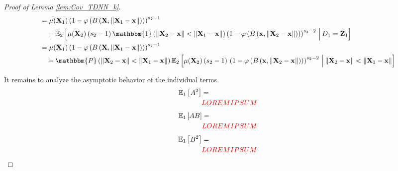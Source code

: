 \documentclass[letterpaper,10pt]{article}
\numberwithin{equation}{section}
\numberwithin{thm}{section}
\numberwithin{lem}{section}
\numberwithin{cor}{section}
\newcommand{\E}{\mathbb{E}}
\newcommand{\1}{\mathbbm{1}}
\renewcommand{\P}{\mathbbm{P}}
\begin{document}
\begin{proof}[Proof of Lemma \ref{lem:Cov_TDNN_k}]
\begin{equation}
\begin{aligned}
			 & = \mu(\mathbf{X}_1) \left(1 - \varphi\left(B\left(\mathbf{X}, \| \mathbf{X}_1 - \mathbf{x} \|\right)\right)\right)^{s_2 - 1} \\
			 & \quad + \E_{2}\left[
				\mu(\mathbf{X}_2)\, (s_2 - 1) \,
				\1\left(\|\mathbf{X}_2 - \mathbf{x}\| < \|\mathbf{X}_1 - \mathbf{x}\|\right)
				\left(1 - \varphi\left(B\left(\mathbf{x}, \| \mathbf{X}_2 - \mathbf{x} \|\right)\right)\right)^{s_2 - 2}
			\, \Big| \, D_1 = \mathbf{Z}_1\right]                                                                                           \\
			 & = \mu(\mathbf{X}_1) \left(1 - \varphi\left(B\left(\mathbf{X}, \| \mathbf{X}_1 - \mathbf{x} \|\right)\right)\right)^{s_2 - 1} \\
			 & \quad + \P\left(\|\mathbf{X}_2 - \mathbf{x}\| < \|\mathbf{X}_1 - \mathbf{x}\|\right)\E_{2}\left[
				\mu(\mathbf{X}_2)\, (s_2 - 1) \,
				\left(1 - \varphi\left(B\left(\mathbf{x}, \| \mathbf{X}_2 - \mathbf{x} \|\right)\right)\right)^{s_2 - 2}
				\, \Big| \, \|\mathbf{X}_2 - \mathbf{x}\| < \|\mathbf{X}_1 - \mathbf{x}\|\right]
		\end{aligned}
	\end{equation}

	It remains to analyze the asymptotic behavior of the individual terms.
	\begin{equation}
		\begin{aligned}
			\E_{1}\left[A^2\right]
			 & =                         \\
			 & {\color{red} LOREM IPSUM}
		\end{aligned}
	\end{equation}
	\begin{equation}
		\begin{aligned}
			\E_{1}\left[AB\right]
			 & =                         \\
			 & {\color{red} LOREM IPSUM}
		\end{aligned}
	\end{equation}
	\begin{equation}
		\begin{aligned}
			\E_{1}\left[B^2\right]
			 & =                         \\
			 & {\color{red} LOREM IPSUM}
		\end{aligned}
	\end{equation}


\end{proof}
\end{document}
